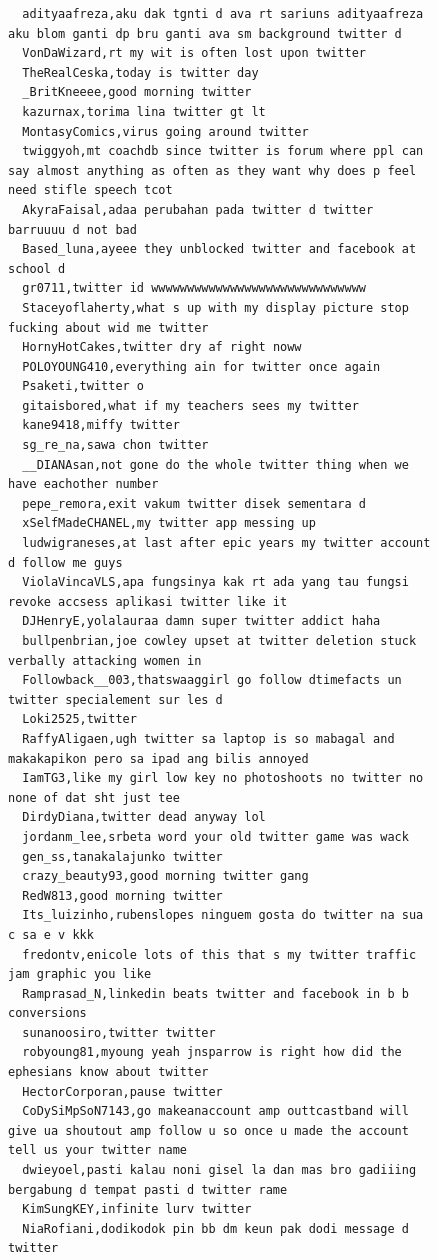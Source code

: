 \begin{figure}[htpb]
\begin{verbatim}
  adityaafreza,aku dak tgnti d ava rt sariuns adityaafreza aku blom ganti dp bru ganti ava sm background twitter d
  VonDaWizard,rt my wit is often lost upon twitter
  TheRealCeska,today is twitter day
  _BritKneeee,good morning twitter
  kazurnax,torima lina twitter gt lt
  MontasyComics,virus going around twitter
  twiggyoh,mt coachdb since twitter is forum where ppl can say almost anything as often as they want why does p feel need stifle speech tcot
  AkyraFaisal,adaa perubahan pada twitter d twitter barruuuu d not bad
  Based_luna,ayeee they unblocked twitter and facebook at school d
  gr0711,twitter id wwwwwwwwwwwwwwwwwwwwwwwwwwwwww
  Staceyoflaherty,what s up with my display picture stop fucking about wid me twitter
  HornyHotCakes,twitter dry af right noww
  POLOYOUNG410,everything ain for twitter once again
  Psaketi,twitter o
  gitaisbored,what if my teachers sees my twitter
  kane9418,miffy twitter
  sg_re_na,sawa chon twitter
  __DIANAsan,not gone do the whole twitter thing when we have eachother number
  pepe_remora,exit vakum twitter disek sementara d
  xSelfMadeCHANEL,my twitter app messing up
  ludwigraneses,at last after epic years my twitter account d follow me guys
  ViolaVincaVLS,apa fungsinya kak rt ada yang tau fungsi revoke accsess aplikasi twitter like it
  DJHenryE,yolalauraa damn super twitter addict haha
  bullpenbrian,joe cowley upset at twitter deletion stuck verbally attacking women in
  Followback__003,thatswaaggirl go follow dtimefacts un twitter specialement sur les d
  Loki2525,twitter
  RaffyAligaen,ugh twitter sa laptop is so mabagal and makakapikon pero sa ipad ang bilis annoyed
  IamTG3,like my girl low key no photoshoots no twitter no none of dat sht just tee
  DirdyDiana,twitter dead anyway lol
  jordanm_lee,srbeta word your old twitter game was wack
  gen_ss,tanakalajunko twitter
  crazy_beauty93,good morning twitter gang
  RedW813,good morning twitter
  Its_luizinho,rubenslopes ninguem gosta do twitter na sua c sa e v kkk
  fredontv,enicole lots of this that s my twitter traffic jam graphic you like
  Ramprasad_N,linkedin beats twitter and facebook in b b conversions
  sunanoosiro,twitter twitter
  robyoung81,myoung yeah jnsparrow is right how did the ephesians know about twitter
  HectorCorporan,pause twitter
  CoDySiMpSoN7143,go makeanaccount amp outtcastband will give ua shoutout amp follow u so once u made the account tell us your twitter name
  dwieyoel,pasti kalau noni gisel la dan mas bro gadiiing bergabung d tempat pasti d twitter rame
  KimSungKEY,infinite lurv twitter
  NiaRofiani,dodikodok pin bb dm keun pak dodi message d twitter

\end{verbatim}
\end{figure}
